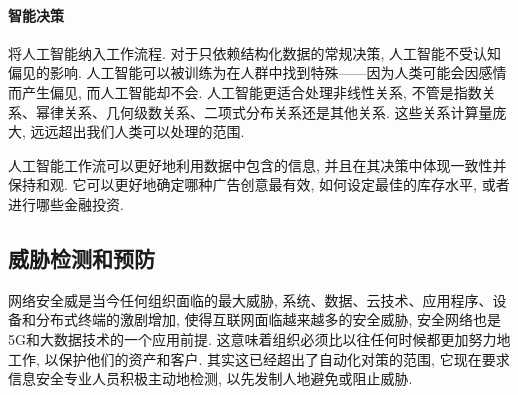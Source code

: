 \paragraph{智能决策}
将人工智能纳入工作流程. 对于只依赖结构化数据的常规决策, 人工智能不受认知偏见的影响. 人工智能可以被训练为在人群中找到特殊——因为人类可能会因感情而产生偏见, 而人工智能却不会.
人工智能更适合处理非线性关系, 不管是指数关系、幂律关系、几何级数关系、二项式分布关系还是其他关系. 这些关系计算量庞大, 远远超出我们人类可以处理的范围.

人工智能工作流可以更好地利用数据中包含的信息, 并且在其决策中体现一致性并保持和观. 它可以更好地确定哪种广告创意最有效, 如何设定最佳的库存水平, 或者进行哪些金融投资.
\subsection{威胁检测和预防}
网络安全威是当今任何组织面临的最大威胁, 系统、数据、云技术、应用程序、设备和分布式终端的激剧增加, 使得互联网面临越来越多的安全威胁, 安全网络也是5G和大数据技术的一个应用前提.
这意味着组织必须比以往任何时候都更加努力地工作, 以保护他们的资产和客户. 其实这已经超出了自动化对策的范围, 它现在要求信息安全专业人员积极主动地检测, 以先发制人地避免或阻止威胁.

